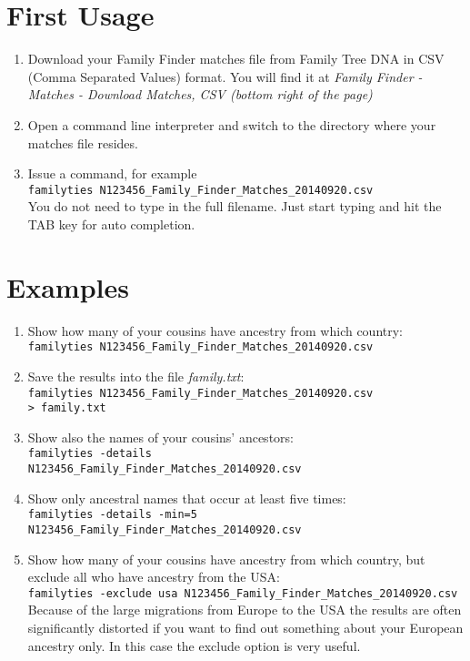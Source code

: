 \documentclass[12pt,a4paper]{article}
\begin{document}
\section{First Usage}

\begin{enumerate}
\item Download your Family Finder matches file from Family Tree DNA
   in CSV (Comma Separated Values) format. You will find it at
   \emph{Family Finder - Matches - Download Matches, CSV
   (bottom right of the page)}
\item Open a command line interpreter and switch to the
   directory where your matches file resides.
\item Issue a command, for example\\
  \texttt{familyties N123456\_Family\_Finder\_Matches\_20140920.csv}\\
  You do not need to type in the full filename. Just start typing and
  hit the TAB key for auto completion.
\end{enumerate}


\section{Examples}

\begin{enumerate}
\item Show how many of your cousins have ancestry from which
   country:\\
   \texttt{familyties N123456\_Family\_Finder\_Matches\_20140920.csv}
\item Save the results into the file \emph{family.txt}:\\
   \texttt{familyties N123456\_Family\_Finder\_Matches\_20140920.csv\\ > family.txt}
\item Show also the names of your cousins' ancestors:\\
   \texttt{familyties -details\\ N123456\_Family\_Finder\_Matches\_20140920.csv}
\item Show only ancestral names that occur at least five times:\\
   \texttt{familyties -details -min=5\\ N123456\_Family\_Finder\_Matches\_20140920.csv}
\item Show how many of your cousins have ancestry from which
   country, but exclude all who have ancestry from the USA:\\
   \texttt{familyties -exclude usa N123456\_Family\_Finder\_Matches\_20140920.csv}\\
   Because of the large migrations from Europe to the USA the results
   are often significantly distorted if you want to find out something
   about your European ancestry only. In this case the exclude option
   is very useful.
\end{enumerate}
\end{document}
